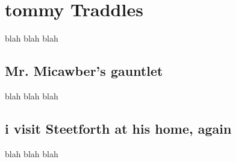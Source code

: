 \section{	tommy Traddles}
blah blah blah

\subsection{\label{mylabel} Mr. Micawber's gauntlet	}
blah blah blah

\subsection{i visit Steetforth at his home, again}
blah blah blah

